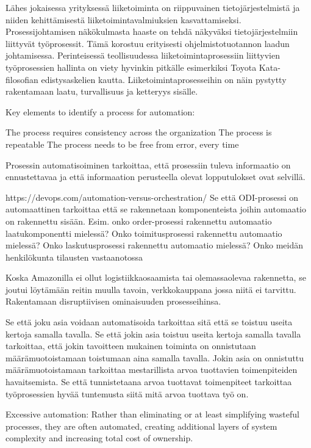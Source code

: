 \documentclass[finnish,12pt,a4paper,pdftex]{article}
\begin{document}
Lähes jokaisessa yrityksessä liiketoiminta on riippuvainen tietojärjestelmistä ja niiden kehittämisestä liiketoimintavalmiuksien kasvattamiseksi. Prosessijohtamisen näkökulmasta haaste on tehdä näkyväksi tietojärjestelmiin liittyvät työprosessit. Tämä korostuu erityisesti ohjelmistotuotannon laadun johtamisessa. Perinteisessä teollisuudessa liiketoimintaprosessiin liittyvien työprosessien hallinta on viety hyvinkin pitkälle esimerkiksi Toyota Kata-filosofian edistysaskelien kautta. Liiketoimintaprosesseihin on näin pystytty rakentamaan laatu, turvallisuus ja ketteryys sisälle. 

Key elements to identify a process for automation: \cite{groover}

The process requires consistency across the organization
The process is repeatable
The process needs to be free from error, every time


Prosessin automatisoiminen tarkoittaa, että prosessiin tuleva informaatio on ennustettavaa ja että informaation perusteella olevat lopputulokset ovat selvillä.

https://devops.com/automation-versus-orchestration/ 
Se että ODI-prosessi on automaattinen tarkoittaa että se rakennetaan komponenteista joihin automaatio on rakennettu sisään. Esim. onko order-prosessi rakennettu automaatio laatukomponentti mielessä? Onko toimitusprosessi rakennettu automaatio mielessä? Onko laskutusprosessi rakennettu automaatio mielessä?
Onko meidän henkilökunta tilausten vastaanotossa 

Koska Amazonilla ei ollut logistiikkaosaamista tai olemassaolevaa rakennetta, se joutui löytämään reitin muulla tavoin, verkkokauppana jossa niitä ei tarvittu. Rakentamaan disruptiivisen ominaisuuden prosesseihinsa.


Se että joku asia voidaan automatisoida tarkoittaa sitä että se toistuu useita kertoja samalla tavalla. Se että jokin asia toistuu useita kertoja samalla tavalla tarkoittaa, että jokin tavoitteen mukainen toiminta on onnistutaan määrämuotoistamaan toistumaan aina samalla tavalla. Jokin asia on onnistuttu määrämuotoistamaan tarkoittaa mestarillista arvoa tuottavien toimenpiteiden havaitsemista. Se
 että tunnistetaana arvoa tuottavat toimenpiteet tarkoittaa työprosessien hyvää tuntemusta siitä mitä arvoa tuottava työ on. 

Excessive automation: Rather than eliminating or at least simplifying
wasteful processes, they are often automated, creating additional
layers of system complexity and increasing total cost of ownership.\citep{leanit}
 
\end{document}

